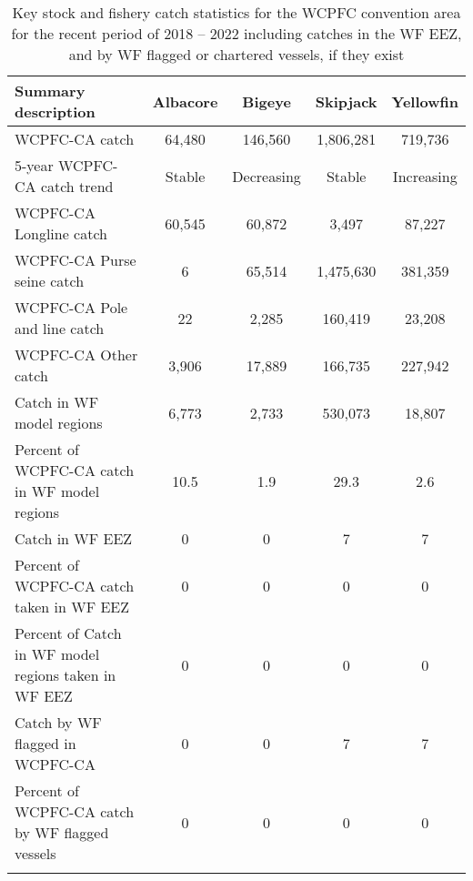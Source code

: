 \begin{longtable}{lcccc}
\caption{Key stock and fishery catch statistics for the WCPFC convention area for the recent period of 2018 -- 2022 including catches in the WF EEZ, and by WF flagged or chartered vessels, if they exist} \\ 
  \hline
Summary description & Albacore & Bigeye & Skipjack & Yellowfin \\ 
  \hline
WCPFC-CA catch & 64,480 & 146,560 & 1,806,281 & 719,736 \\ 
  5-year WCPFC-CA catch trend & Stable & Decreasing & Stable & Increasing \\ 
  WCPFC-CA Longline catch & 60,545 & 60,872 & 3,497 & 87,227 \\ 
  WCPFC-CA Purse seine catch & 6 & 65,514 & 1,475,630 & 381,359 \\ 
  WCPFC-CA Pole and line catch & 22 & 2,285 & 160,419 & 23,208 \\ 
  WCPFC-CA Other catch & 3,906 & 17,889 & 166,735 & 227,942 \\ 
  Catch in WF model regions & 6,773 & 2,733 & 530,073 & 18,807 \\ 
  Percent of WCPFC-CA catch in WF model regions & 10.5 & 1.9 & 29.3 & 2.6 \\ 
   \hline
Catch in WF EEZ & 0 & 0 & 7 & 7 \\ 
  Percent of WCPFC-CA catch taken in WF EEZ & 0 & 0 & 0 & 0 \\ 
  Percent of Catch in WF model regions taken in WF EEZ & 0 & 0 & 0 & 0 \\ 
  Catch by WF flagged in WCPFC-CA & 0 & 0 & 7 & 7 \\ 
  Percent of WCPFC-CA catch by WF flagged vessels & 0 & 0 & 0 & 0 \\ 
  \hline
\label{cat_sum_tab}
\end{longtable}
